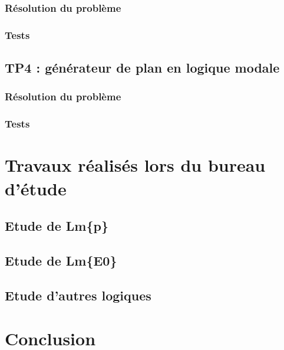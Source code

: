 \documentclass[a4paper,10pt]{article}
\begin{document}
   \subsubsection{R\'{e}solution du probl\`{e}me}
   \subsubsection{Tests}
   
  \subsection{TP4 : g\'{e}n\'{e}rateur de plan en logique modale}
  
   \subsubsection{R\'{e}solution du probl\`{e}me}
   \subsubsection{Tests}
   
   
 \section{Travaux r\'{e}alis\'{e}s lors du bureau d'\'{e}tude}
 
  \subsection{Etude de Lm\{p\} }
  
  \subsection{Etude de Lm\{E0\}}
  
  \subsection{Etude d'autres logiques}
  
 \section{Conclusion}
    
\end{document}

